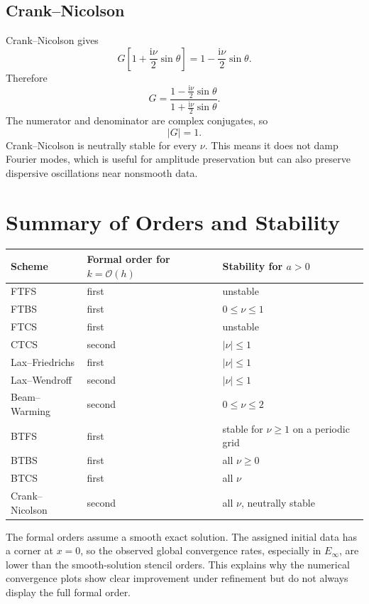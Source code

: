 \documentclass[11pt]{article}
\newcommand{\ii}{\mathrm{i}}
\newcommand{\Oh}{\mathcal{O}}
\begin{document}
\subsection{Crank--Nicolson}

Crank--Nicolson gives
\begin{equation}
    G\left[1+\frac{\ii\nu}{2}\sin\theta\right]
    =
    1-\frac{\ii\nu}{2}\sin\theta.
\end{equation}
Therefore
\begin{equation}
    G=
    \frac{1-\frac{\ii\nu}{2}\sin\theta}
         {1+\frac{\ii\nu}{2}\sin\theta}.
\end{equation}
The numerator and denominator are complex conjugates, so
\begin{equation}
    |G|=1.
\end{equation}
Crank--Nicolson is neutrally stable for every $\nu$.  This means it does not damp Fourier modes, which is useful for amplitude preservation but can also preserve dispersive oscillations near nonsmooth data.

\section{Summary of Orders and Stability}

\begin{table}[h]
\centering
\small
\begin{tabular}{@{}lll@{}}
\toprule
Scheme & Formal order for $k=\Oh(h)$ & Stability for $a>0$\\
\midrule
FTFS & first & unstable\\
FTBS & first & $0\le\nu\le1$\\
FTCS & first & unstable\\
CTCS & second & $|\nu|\le1$\\
Lax--Friedrichs & first & $|\nu|\le1$\\
Lax--Wendroff & second & $|\nu|\le1$\\
Beam--Warming & second & $0\le\nu\le2$\\
BTFS & first & stable for $\nu\ge1$ on a periodic grid\\
BTBS & first & all $\nu\ge0$\\
BTCS & first & all $\nu$\\
Crank--Nicolson & second & all $\nu$, neutrally stable\\
\bottomrule
\end{tabular}
\end{table}

The formal orders assume a smooth exact solution.  The assigned initial data has a corner at $x=0$, so the observed global convergence rates, especially in $E_\infty$, are lower than the smooth-solution stencil orders.  This explains why the numerical convergence plots show clear improvement under refinement but do not always display the full formal order.
\end{document}
